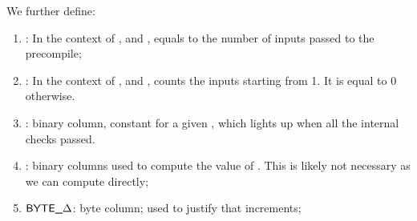 We further define: 

\begin{enumerate}[resume]
  \item \totalInputs:
        In the context of ,  and , equals to the number of inputs passed to the precompile;
  \item \accInputs: In the context of ,  and , counts the inputs starting from 1. It is equal to 0 otherwise.
  \item \both{\internalChecksPassed}:
        binary column, constant for a given \blsId, which lights up when all the internal checks passed.
  \item \hurdle:
        binary columns used to compute the value of \internalChecksPassed{}. This is likely not necessary as we can compute \internalChecksPassed{} directly; 
  \item $\textsf{BYTE}\textsf{\_$\Delta$}$:
        byte column; used to justify that \blsId{} increments;
\end{enumerate}

